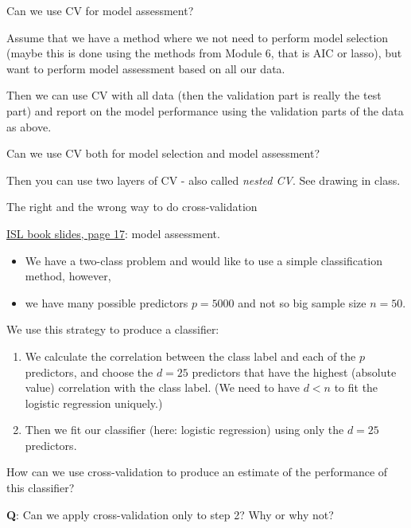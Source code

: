 \documentclass[10pt,ignorenonframetext,]{beamer}
\providecommand{\tightlist}{%
  \setlength{\itemsep}{0pt}\setlength{\parskip}{0pt}}
\begin{document}
\begin{frame}

\begin{block}{Can we use CV for model assessment?}

Assume that we have a method where we not need to perform model
selection (maybe this is done using the methods from Module 6, that is
AIC or lasso), but want to perform model assessment based on all our
data.

Then we can use CV with all data (then the validation part is really the
test part) and report on the model performance using the validation
parts of the data as above.

\end{block}

\begin{block}{Can we use CV both for model selection and model
assessment?}

Then you can use two layers of CV - also called \emph{nested CV}. See
drawing in class.

\end{block}

\end{frame}

\begin{frame}

\begin{block}{The right and the wrong way to do cross-validation}

\href{https://lagunita.stanford.edu/c4x/HumanitiesScience/StatLearning/asset/cv_boot.pdf}{ISL
book slides, page 17}: model assessment.

\begin{itemize}
\tightlist
\item
  We have a two-class problem and would like to use a simple
  classification method, however,
\item
  we have many possible predictors \(p=5000\) and not so big sample size
  \(n=50\).
\end{itemize}

We use this strategy to produce a classifier:

\begin{enumerate}
\def\labelenumi{\arabic{enumi}.}
\tightlist
\item
  We calculate the correlation between the class label and each of the
  \(p\) predictors, and choose the \(d=25\) predictors that have the
  highest (absolute value) correlation with the class label. (We need to
  have \(d<n\) to fit the logistic regression uniquely.)
\item
  Then we fit our classifier (here: logistic regression) using only the
  \(d=25\) predictors.
\end{enumerate}

How can we use cross-validation to produce an estimate of the
performance of this classifier?

\textbf{Q}: Can we apply cross-validation only to step 2? Why or why
not?

\end{block}

\end{frame}
\end{document}

